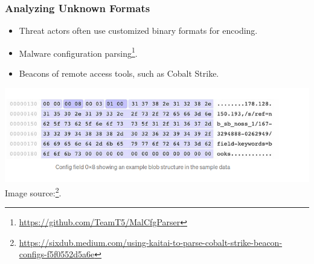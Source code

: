 \begin{frame}
    \frametitle{Analyzing Unknown Formats}

    \begin{itemize}
        \item Threat actors often use customized binary formats for encoding.
        \item Malware configuration parsing\footnote{\url{https://github.com/TeamT5/MalCfgParser}}.
        \item Beacons of remote access tools, such as Cobalt Strike.
    \end{itemize}
    \centering
    \includegraphics[scale=0.5]{img/cobalt.png}
    Image source:\footnote{\url{https://sixdub.medium.com/using-kaitai-to-parse-cobalt-strike-beacon-configs-f5f0552d5a6e}}.
\end{frame}


